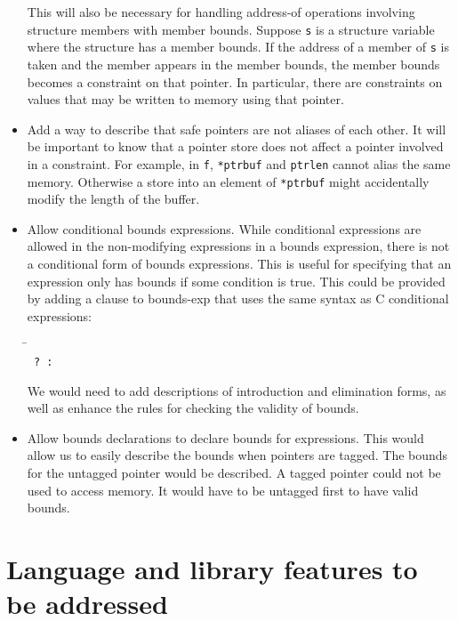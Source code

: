 \begin{itemize}
      This will also be necessary for handling address-of operations
      involving structure members with member bounds.
      Suppose \texttt{s} is a structure variable where the structure 
      has a member bounds. If the address of a member of \texttt{s} is
      taken and the member appears in the member bounds, the member
      bounds becomes a constraint on that pointer.  In particular, 
      there are constraints on values that may be written to memory using 
      that pointer.
\item Add a way to describe that safe pointers are not aliases
      of each other. It will be important to know that a pointer store 
      does not affect a pointer involved in a constraint.  For example,
      in \texttt{f}, \texttt{*ptrbuf} and \texttt{ptrlen} cannot alias 
      the same memory. Otherwise a store into an element of \texttt{*ptrbuf}
      might accidentally  modify the length of the buffer.
\item Allow conditional bounds expressions.   While conditional
expressions are allowed in the non-modifying expressions in a bounds expression, 
there is not a conditional form of bounds expressions.  This is useful for
specifying that an expression only has bounds if some condition is true.
This could be provided by adding a clause to bounds-exp that uses the
same syntax as C conditional expressions:
\begin{tabbing}
\= \\
\>\texttt{ ?  : }
\end{tabbing}

We would need to add descriptions of introduction and elimination
forms, as well as enhance the rules for checking the validity of bounds.
\item Allow bounds declarations to declare bounds for expressions.
This would allow us to easily describe the bounds when pointers are tagged.
The bounds for the untagged pointer would be described. 
A tagged pointer could not be used to access memory.  It would have to be
untagged first  to have valid bounds.
\end{itemize}

\section{Language and library features to be addressed}

